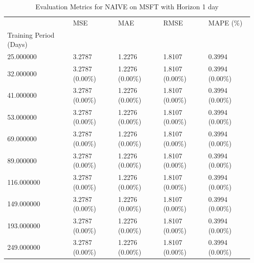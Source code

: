 \begin{table}
\caption{Evaluation Metrics for NAIVE on MSFT with Horizon 1 day}
\label{tab:naive_MSFT_h1_metrics}
\begin{tabular}{lllll}
\toprule
 & MSE & MAE & RMSE & MAPE (\%) \\
Training Period (Days) &  &  &  &  \\
\midrule
25.000000 & 3.2787 & 1.2276 & 1.8107 & 0.3994 \\
32.000000 & 3.2787 (0.00\%) & 1.2276 (0.00\%) & 1.8107 (0.00\%) & 0.3994 (0.00\%) \\
41.000000 & 3.2787 (0.00\%) & 1.2276 (0.00\%) & 1.8107 (0.00\%) & 0.3994 (0.00\%) \\
53.000000 & 3.2787 (0.00\%) & 1.2276 (0.00\%) & 1.8107 (0.00\%) & 0.3994 (0.00\%) \\
69.000000 & 3.2787 (0.00\%) & 1.2276 (0.00\%) & 1.8107 (0.00\%) & 0.3994 (0.00\%) \\
89.000000 & 3.2787 (0.00\%) & 1.2276 (0.00\%) & 1.8107 (0.00\%) & 0.3994 (0.00\%) \\
116.000000 & 3.2787 (0.00\%) & 1.2276 (0.00\%) & 1.8107 (0.00\%) & 0.3994 (0.00\%) \\
149.000000 & 3.2787 (0.00\%) & 1.2276 (0.00\%) & 1.8107 (0.00\%) & 0.3994 (0.00\%) \\
193.000000 & 3.2787 (0.00\%) & 1.2276 (0.00\%) & 1.8107 (0.00\%) & 0.3994 (0.00\%) \\
249.000000 & 3.2787 (0.00\%) & 1.2276 (0.00\%) & 1.8107 (0.00\%) & 0.3994 (0.00\%) \\
\bottomrule
\end{tabular}
\end{table}

